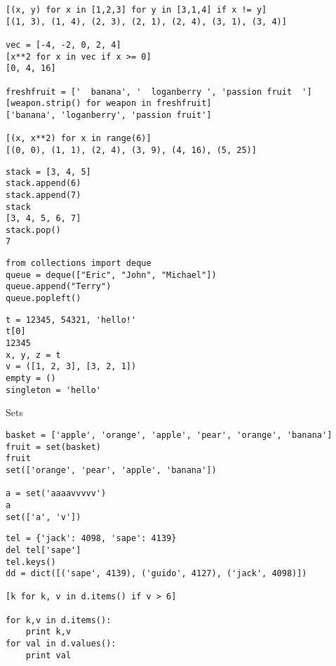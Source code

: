 \documentclass[9pt]{amsart}
\begin{document}
\begin{multicols}{2}
\noindent {\textcolor {blue} {\em List Comprehension}} 

\begin{lstlisting}
[(x, y) for x in [1,2,3] for y in [3,1,4] if x != y]
[(1, 3), (1, 4), (2, 3), (2, 1), (2, 4), (3, 1), (3, 4)]

vec = [-4, -2, 0, 2, 4]
[x**2 for x in vec if x >= 0]
[0, 4, 16]

freshfruit = ['  banana', '  loganberry ', 'passion fruit  ']
[weapon.strip() for weapon in freshfruit]
['banana', 'loganberry', 'passion fruit']

[(x, x**2) for x in range(6)]
[(0, 0), (1, 1), (2, 4), (3, 9), (4, 16), (5, 25)]
\end{lstlisting}

\noindent {\textcolor {blue} {\em Using Lists as Stacks}}
\begin{lstlisting}
stack = [3, 4, 5]
stack.append(6)
stack.append(7)
stack
[3, 4, 5, 6, 7]
stack.pop()
7
\end{lstlisting}

\noindent {\textcolor {blue} {\em Using Lists as Queue}}

\begin{lstlisting}
from collections import deque
queue = deque(["Eric", "John", "Michael"])
queue.append("Terry")
queue.popleft()
\end{lstlisting}

\noindent {\textcolor {blue} {\em Tuples}}
\begin{lstlisting}
t = 12345, 54321, 'hello!'
t[0]
12345
x, y, z = t
v = ([1, 2, 3], [3, 2, 1])
empty = ()
singleton = 'hello'
\end{lstlisting}

Sets
\begin{lstlisting}
basket = ['apple', 'orange', 'apple', 'pear', 'orange', 'banana']
fruit = set(basket) 
fruit
set(['orange', 'pear', 'apple', 'banana'])

a = set('aaaavvvvv')
a
set(['a', 'v'])
\end{lstlisting}


\noindent {\textcolor {blue} {\em Dictionaries}}   
\begin{lstlisting}
tel = {'jack': 4098, 'sape': 4139}
del tel['sape']
tel.keys()
dd = dict([('sape', 4139), ('guido', 4127), ('jack', 4098)])

[k for k, v in d.items() if v > 6]

for k,v in d.items():
	print k,v
for val in d.values():
	print val
\end{lstlisting}


\end{multicols}
\end{document}

